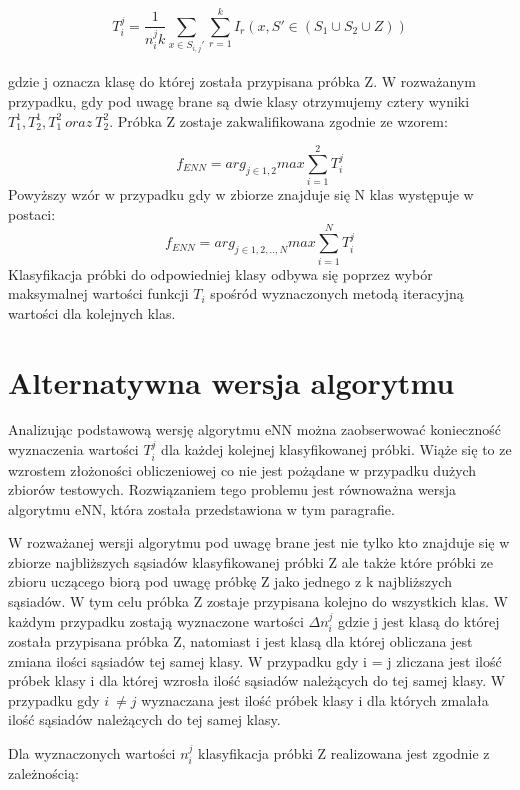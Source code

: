 \documentclass[12pt]{report}
\begin{document}
{\begin{equation}
T_{i}^{j} = \frac{1}{n_i^j k} {\sum_{x \in S_{i,j}'} \sum_{r=1}^{k} I_r (x,S' \in (S_1 \cup S_2 \cup {Z}))} 
\end{equation}\\
gdzie j oznacza klasę do której została przypisana próbka Z.
W rozważanym przypadku, gdy pod uwagę brane są dwie klasy otrzymujemy cztery wyniki $T_1^1, T_2^1, T_1^2\ oraz\ T_2^2$. Próbka Z zostaje zakwalifikowana zgodnie ze wzorem:

\begin{equation}
f_{ENN} = arg_{j\in1,2} max \sum_{i=1}^{2} T_i^j
\end{equation}
Powyższy wzór w przypadku gdy w zbiorze znajduje się N klas występuje w postaci:
\begin{equation}
f_{ENN} = arg_{j\in1,2,..,N} max \sum_{i=1}^{N} T_i^j
\end{equation}
Klasyfikacja próbki do odpowiedniej klasy odbywa się poprzez wybór maksymalnej wartości funkcji $T_i$ spośród wyznaczonych metodą iteracyjną wartości dla kolejnych klas.

\newpage
\section{Alternatywna wersja algorytmu}
Analizując podstawową wersję algorytmu eNN można zaobserwować konieczność wyznaczenia wartości $T_i^j$ dla każdej kolejnej klasyfikowanej próbki. Wiąże się to  ze wzrostem złożoności obliczeniowej co nie jest pożądane w przypadku dużych zbiorów testowych. Rozwiązaniem tego problemu jest równoważna wersja algorytmu eNN, która została przedstawiona w tym paragrafie. 

W rozważanej wersji algorytmu pod uwagę brane jest nie tylko kto znajduje się w zbiorze najbliższych sąsiadów klasyfikowanej próbki Z ale także które próbki ze zbioru uczącego biorą pod uwagę próbkę Z jako jednego z k najbliższych sąsiadów. W tym celu próbka Z zostaje przypisana kolejno do wszystkich klas. W każdym przypadku zostają wyznaczone wartości $\Delta n_i^j$ gdzie j jest klasą do której została przypisana próbka Z, natomiast i jest klasą dla której obliczana jest zmiana ilości sąsiadów tej samej klasy. W przypadku gdy i = j zliczana jest ilość próbek klasy i dla której wzrosła ilość sąsiadów należących do tej samej klasy. W przypadku gdy $i\ \neq j$ wyznaczana jest ilość próbek klasy i dla których zmalała ilość sąsiadów należących do tej samej klasy.

Dla wyznaczonych wartości $n_i^j$ klasyfikacja próbki Z realizowana jest zgodnie z zależnością:

}
\end{document}

